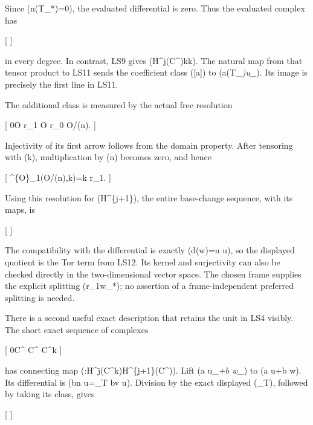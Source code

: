 \documentclass[
]{article}
\begin{document}
Since (n(T\_*)=0), the evaluated differential is zero. Thus the
evaluated complex has

{[}   {]}

in every degree. In contrast, LS9 gives
(H\^{}j(\mathcal C\^{}\bullet)\otimes k\cong k). The natural map from
that tensor product to LS11 sends the coefficient class ({[}a{]}) to
(a(T\_\emph{)u\_}). Its image is precisely the first line in LS11.

The additional class is measured by the actual free resolution

{[} 0\longrightarrow\mathcal O r\_1 \mathcal O r\_0
\longrightarrow\mathcal O/(n).  {]}

Injectivity of its first arrow follows from the domain property. After
tensoring with (k), multiplication by (n) becomes zero, and hence

{[} \^{}\{\mathcal O\}\_1(\mathcal O/(n),k)=k r\_1.
{]}

Using this resolution for (H\^{}\{j+1\}), the entire base-change
sequence, with its maps, is

{[}   {]}

The compatibility with the differential is exactly (d(w)=n u), so the
displayed quotient is the Tor term from LS12. Its kernel and
surjectivity can also be checked directly in the two-dimensional vector
space. The chosen frame supplies the explicit splitting
(r\_1\mapsto w\_*); no assertion of a frame-independent preferred
splitting is needed.

There is a second useful exact description that retains the unit in LS4
visibly. The short exact sequence of complexes

{[} 0\longrightarrow\mathcal C\^{}\bullet
{}\mathcal C\^{}\bullet
\longrightarrow\mathcal C\^{}\bullet\otimes k {]}

has connecting map
(\delta:H\^{}j(\mathcal C\^{}\bullet\otimes k)\to H\^{}\{j+1\}(\mathcal C\^{}\bullet)).
Lift (a u\_\emph{+b w\_}) to (a u+b w). Its differential is (bn
u=\tau\_T bv u). Division by the exact displayed (\tau\_T), followed by
taking its class, gives

{[}   {]}
\end{document}
